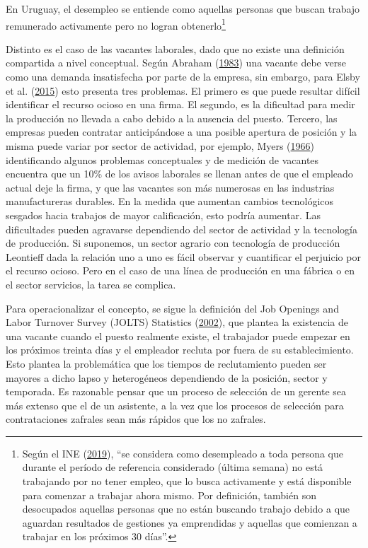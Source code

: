 \documentclass[12pt,oneside]{reedthesis}
\begin{document}
En Uruguay, el desempleo se entiende como aquellas personas que buscan trabajo remunerado activamente pero no logran obtenerlo\footnote{Según el INE (\protect\hyperlink{ref-INE2019}{2019}), ``se considera como desempleado a toda persona que durante el período de referencia considerado (última semana) no está trabajando por no tener empleo, que lo busca activamente y está disponible para comenzar a trabajar ahora mismo. Por definición, también son desocupados aquellas personas que no están buscando trabajo debido a que aguardan resultados de gestiones ya emprendidas y aquellas que comienzan a trabajar en los próximos 30 días''.}

Distinto es el caso de las vacantes laborales, dado que no existe una definición compartida a nivel conceptual. Según Abraham (\protect\hyperlink{ref-Abraham1983}{1983}) una vacante debe verse como una demanda insatisfecha por parte de la empresa, sin embargo, para Elsby et al. (\protect\hyperlink{ref-Elsby2015}{2015}) esto presenta tres problemas. El primero es que puede resultar difícil identificar el recurso ocioso en una firma. El segundo, es la dificultad para medir la producción no llevada a cabo debido a la ausencia del puesto. Tercero, las empresas pueden contratar anticipándose a una posible apertura de posición y la misma puede variar por sector de actividad, por ejemplo, Myers (\protect\hyperlink{ref-Myers1966}{1966}) identificando algunos problemas conceptuales y de medición de vacantes encuentra que un 10\% de los avisos laborales se llenan antes de que el empleado actual deje la firma, y que las vacantes son más numerosas en las industrias manufactureras durables. En la medida que aumentan cambios tecnológicos sesgados hacia trabajos de mayor calificación, esto podría aumentar. Las dificultades pueden agravarse dependiendo del sector de actividad y la tecnología de producción. Si suponemos, un sector agrario con tecnología de producción Leontieff dada la relación uno a uno es fácil observar y cuantificar el perjuicio por el recurso ocioso. Pero en el caso de una línea de producción en una fábrica o en el sector servicios, la tarea se complica.

Para operacionalizar el concepto, se sigue la definición del Job Openings and Labor Turnover Survey (JOLTS) Statistics (\protect\hyperlink{ref-JOLTS}{2002}), que plantea la existencia de una vacante cuando el puesto realmente existe, el trabajador puede empezar en los próximos treinta días y el empleador recluta por fuera de su establecimiento. Esto plantea la problemática que los tiempos de reclutamiento pueden ser mayores a dicho lapso y heterogéneos dependiendo de la posición, sector y temporada. Es razonable pensar que un proceso de selección de un gerente sea más extenso que el de un asistente, a la vez que los procesos de selección para contrataciones zafrales sean más rápidos que los no zafrales.
\end{document}

